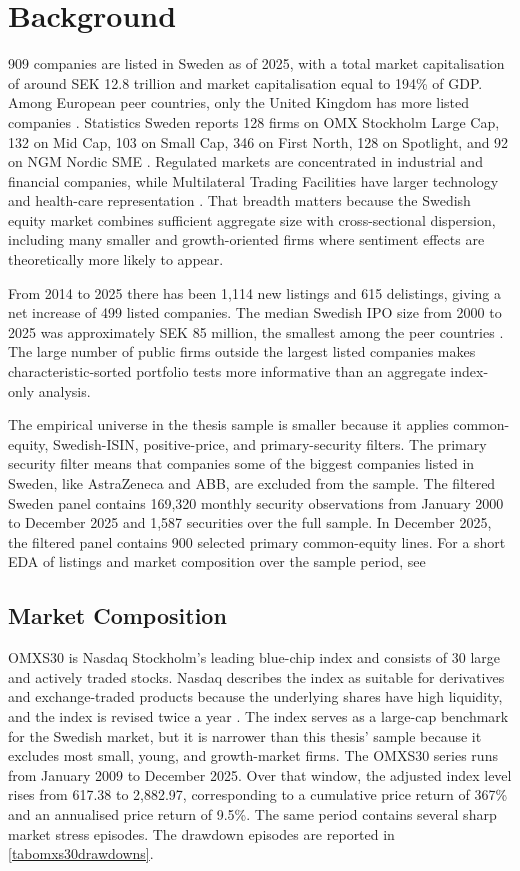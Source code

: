 \documentclass[11pt]{article}
\begin{document}
\section{Background}
909 companies are listed in Sweden as of 2025, with a total market capitalisation of around SEK 12.8 trillion and market capitalisation equal to 194\% of GDP. Among European peer countries, only the United Kingdom has more listed companies \citep{oecd2026swedishequitymarket}. Statistics Sweden reports 128 firms on OMX Stockholm Large Cap, 132 on Mid Cap, 103 on Small Cap, 346 on First North, 128 on Spotlight, and 92 on NGM Nordic SME \citep{scb2026shareholders}. Regulated markets are concentrated in industrial and financial companies, while Multilateral Trading Facilities have larger technology and health-care representation \citep{oecd2026swedishequitymarket}. That breadth matters because the Swedish equity market combines sufficient aggregate size with cross-sectional dispersion, including many smaller and growth-oriented firms where sentiment effects are theoretically more likely to appear. 

From 2014 to 2025 there has been 1,114 new listings and 615 delistings, giving a net increase of 499 listed companies. The median Swedish IPO size from 2000 to 2025 was approximately SEK 85 million, the smallest among the peer countries \citep{oecd2026swedishequitymarket}. The large number of public firms outside the largest listed companies makes characteristic-sorted portfolio tests more informative than an aggregate index-only analysis.

The empirical universe in the thesis sample is smaller because it applies common-equity, Swedish-ISIN, positive-price, and primary-security filters. The primary security filter means that companies some of the biggest companies listed in Sweden, like AstraZeneca and ABB, are excluded from the sample. The filtered Sweden panel contains 169,320 monthly security observations from January 2000 to December 2025 and 1,587 securities over the full sample. In December 2025, the filtered panel contains 900 selected primary common-equity lines. For a short EDA of listings and market composition over the sample period, see 

\subsection{Market Composition}
OMXS30 is Nasdaq Stockholm's leading blue-chip index and consists of 30 large and actively traded stocks. Nasdaq describes the index as suitable for derivatives and exchange-traded products because the underlying shares have high liquidity, and the index is revised twice a year \citep{nasdaq2026omxs30overview}. The index serves as a large-cap benchmark for the Swedish market, but it is narrower than this thesis' sample because it excludes most small, young, and growth-market firms. The OMXS30 series runs from January 2009 to December 2025. Over that window, the adjusted index level rises from 617.38 to 2,882.97, corresponding to a cumulative price return of 367\% and an annualised price return of 9.5\%. The same period contains several sharp market stress episodes. The drawdown episodes are reported in \cref{tabomxs30drawdowns}.
\end{document}

